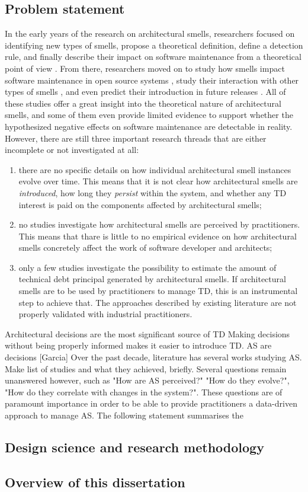 \subsection{Problem statement}
In the early years of the research on architectural smells, researchers focused on identifying new types of smells, propose a  theoretical definition, define a detection rule, and finally describe their impact on software maintenance from a theoretical point of view \cite{Lippert2006,Garcia2009,Mo2015,Le2016,Arcelli2016}.
From there, researchers moved on to study how smells impact software maintenance in open source systems \cite{Choudhary2016,Xiao2016,Le2018}, study their interaction with other types of smells \cite{Sharma2017,Arcelli2019}, and even predict their introduction in future releases \cite{Arcelli2019b}.
All of these studies offer a great insight into the theoretical nature of architectural smells, and some of them even provide limited evidence to support whether the hypothesized negative effects on software maintenance are detectable in reality.
However, there are still three important research threads that are either incomplete or not investigated at all:
\begin{enumerate}
    \item there are no specific details on how individual architectural smell instances evolve over time. This means that it is not clear how architectural smells are \emph{introduced}, how long they \emph{persist} within the system, and whether any TD interest is paid on the components affected by architectural smells; 
    \item no studies investigate how architectural smells are perceived by practitioners. This means that thare is little to no empirical evidence on how architectural smells concretely affect the work of software developer and architects;
    \item only a few studies investigate the possibility to estimate the amount of technical debt principal generated by architectural smells. If architectural smells are to be used by practitioners to manage TD, this is an instrumental step to achieve that. The approaches described by existing literature are not properly validated with industrial practitioners.
\end{enumerate}


Architectural decisions are the most significant source of TD
Making decisions without being properly informed makes it easier to introduce TD.
AS are decisions [Garcia]
Over the past decade, literature has several works studying AS. Make list of studies and what they achieved, briefly.
Several questions remain unanswered however, such as "How are AS perceived?" "How do they evolve?", "How do they correlate with changes in the system?".
These questions are of paramount importance in order to be able to provide practitioners a data-driven approach to manage AS.
The following statement summarises the 

\subsection{Design science and research methodology}
\subsection{Overview of this dissertation}

